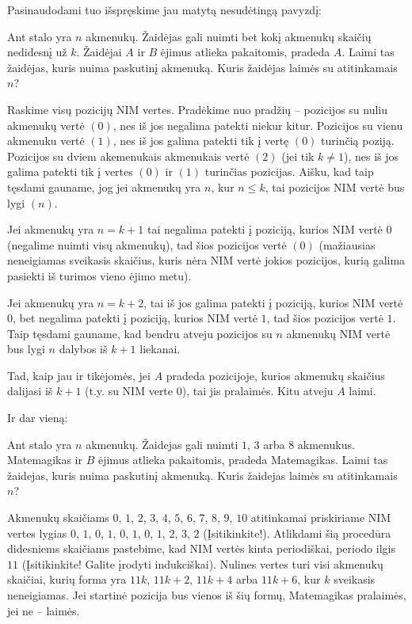 Pasinaudodami tuo išspręskime jau matytą nesudėtingą pavyzdį:

\begin{pav}
  Ant stalo yra $n$ akmenukų. Žaidėjas gali nuimti bet kokį akmenukų skaičių
  nedidesnį už $k$. Žaidėjai $A$ ir $B$ ėjimus atlieka pakaitomis, pradeda $A$.
  Laimi tas žaidėjas, kuris nuima paskutinį akmenuką. Kuris žaidėjas laimės su
  atitinkamais $n$?
\end{pav}

\begin{sprendimas}
  Raskime visų pozicijų NIM vertes. Pradėkime nuo pradžių -- pozicijos su
  nuliu akmenukų vertė $(0)$, nes iš jos negalima patekti niekur kitur.
  Pozicijos su vienu akmenuku vertė $(1)$, nes iš jos galima patekti tik į
  vertę $(0)$ turinčią poziją. Pozicijos su dviem akemenukais akmenukais
  vertė $(2)$ (jei tik $k \neq 1$), nes iš jos galima patekti tik į vertes
  $(0)$ ir $(1)$ turinčias pozicijas. Aišku, kad taip tęsdami gauname, jog
  jei akmenukų yra $n$, kur $n \leq k$, tai pozicijos NIM vertė bus lygi
  $(n)$.

  Jei akmenukų yra $n=k+1$ tai negalima patekti į poziciją, kurios NIM
  vertė $0$ (negalime nuimti visų akmenukų), tad šios pozicijos vertė $(0)$
  (mažiausias neneigiamas sveikasis skaičius, kuris nėra NIM vertė jokios
  pozicijos, kurią galima pasiekti iš turimos vieno ėjimo metu).

  Jei akmenukų yra $n=k+2$, tai iš jos galima patekti į poziciją, kurios
  NIM vertė $0$, bet negalima patekti į poziciją, kurios NIM vertė $1$, tad
  šios pozicijos vertė $1$. Taip tęsdami gauname, kad bendru atveju
  pozicijos su $n$ akmenukų NIM vertė bus lygi $n$ dalybos iš $k+1$
  liekanai.

  Tad, kaip jau ir tikėjomės, jei $A$ pradeda pozicijoje, kurios akmenukų
  skaičius dalijasi iš $k+1$ (t.y. su NIM verte $0$), tai jis pralaimės.
  Kitu atveju $A$ laimi.
\end{sprendimas}

Ir dar vieną:

\begin{pavnr}
  Ant stalo yra $n$ akmenukų. Žaidejas gali nuimti $1$, $3$ arba $8$ akmenukus.
  Matemagikas ir $B$ ėjimus atlieka pakaitomis, pradeda Matemagikas. Laimi tas
  žaidejas, kuris nuima paskutinį akmenuką. Kuris žaidejas laimės su
  atitinkamais $n$?
\end{pavnr}

\begin{sprendimas}
  Akmenukų skaičiams $0$, $1$, $2$, $3$, $4$, $5$, $6$, $7$, $8$, $9$, $10$
  atitinkamai priskiriame NIM vertes lygias $0$, $1$, $0$, $1$, $0$, $1$,
  $0$, $1$, $2$, $3$, $2$ (Įsitikinkite!). Atlikdami šią procedūra didesniems
  skaičiams pastebime, kad NIM vertės kinta periodiškai, periodo ilgis $11$
  (Įsitikinkite! Galite įrodyti indukciškai). Nulines vertes turi visi
  akmenukų skaičiai, kurių forma yra $11k$, $11k+2$, $11k+4$ arba $11k+6$,
  kur $k$ sveikasis neneigiamas. Jei startinė pozicija bus vienos iš šių
  formų, Matemagikas pralaimės, jei ne -- laimės.
\end{sprendimas}

